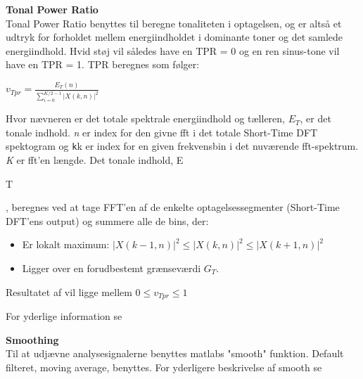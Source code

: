 \textbf{Tonal Power Ratio} \\
Tonal Power Ratio benyttes til beregne tonaliteten i optagelsen, og er altså et udtryk for forholdet mellem energiindholdet i dominante toner og det samlede energiindhold. Hvid støj vil således have en TPR = 0 og en ren sinus-tone vil have en TPR = 1. TPR beregnes som følger: 
\begin{center}
${ v }_{ Tpr }=\frac { { E }_{ T }(n) }{ \sum _{ i=0 }^{ K/2-1 }{ { \left| X(k,n) \right|  }^{ 2 } }  } $
\end{center}

Hvor nævneren er det totale spektrale energiindhold og tælleren, ${ E }_{ T }$, er det tonale indhold. 
\textit{n} er index for den givne fft i det totale Short-Time DFT spektogram og \verb+k+k er index for en given frekvensbin i det nuværende fft-spektrum. \textit{K} er fft'en længde.
Det tonale indhold, E\begin{tiny}T\end{tiny}, beregnes ved at tage FFT'en af de enkelte optagelsessegmenter (Short-Time DFT'ens output) og summere alle de bins, der:
\begin{itemize}
	\item Er lokalt maximum: ${ \left| X(k-1,n) \right|  }^{ 2 }\le { \left| X(k,n) \right|  }^{ 2 }\le { \left| X(k+1,n) \right|  }^{ 2 }$
	\item Ligger over en forudbestemt grænseværdi ${ G }_{ T }$.
\end{itemize} 	

Resultatet af vil ligge mellem $0\le { v }_{ Tpr }\le 1$

For yderlige information se \citep[pp. 56-57]{TPR_calc}

\textbf{Smoothing} \\
Til at udjævne analysesignalerne benyttes matlabs "smooth" funktion. Default filteret, moving average, benyttes. For yderligere beskrivelse af smooth se \citep{website:smooth}

